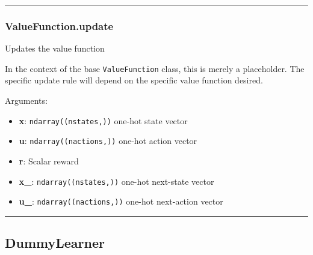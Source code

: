 \begin{center}\rule{0.5\linewidth}{\linethickness}\end{center}

\hypertarget{valuefunction.update}{%
\subsubsection{ValueFunction.update}\label{valuefunction.update}}

\begin{Shaded}
\begin{Highlighting}[]
\end{Highlighting}
\end{Shaded}

Updates the value function

In the context of the base \texttt{ValueFunction} class, this is merely
a placeholder. The specific update rule will depend on the specific
value function desired.

Arguments:

\begin{itemize}
\tightlist
\item
  \textbf{x}: \texttt{ndarray((nstates,))} one-hot state vector
\item
  \textbf{u}: \texttt{ndarray((nactions,))} one-hot action vector
\item
  \textbf{r}: Scalar reward
\item
  \textbf{x\_}: \texttt{ndarray((nstates,))} one-hot next-state vector
\item
  \textbf{u\_}: \texttt{ndarray((nactions,))} one-hot next-action vector
\end{itemize}

\begin{center}\rule{0.5\linewidth}{\linethickness}\end{center}

\hypertarget{dummylearner}{%
\subsection{DummyLearner}\label{dummylearner}}

\begin{Shaded}
\begin{Highlighting}[]
\end{Highlighting}
\end{Shaded}

